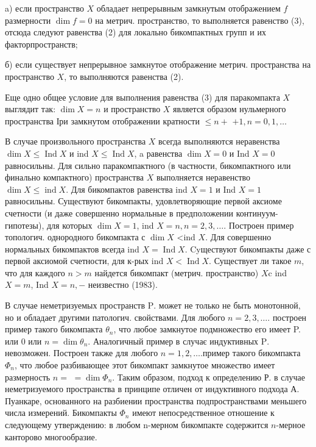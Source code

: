 \documentclass[10pt]{article}
\begin{document}
a) если пространство $X$ обладает непрерывным замкнутым отображением $f$ размерности $\operatorname{dim} f=0$ на метрич. пространство, то выполняется равенство (3), отсюда следуют равенства (2) для локально бикомпактных групп и их факторпространств;



б) если существует непрерывное замкнутое отображение метрич. пространства на пространство $X$, то выполняются равенства (2).



Еще одно общее условие для выполнения равенства (3) для паракомпакта $X$ выглядит так: $\operatorname{dim} X=n$ и пространство $X$ является образом нульмерного пространства Іри замкнутом отображении кратности $\leqslant n+$ $+1, n=0,1, \ldots$



В случае произвольного пространства $X$ всегда выполняются неравенства $\operatorname{dim} X \leqslant \operatorname{Ind} X$ и ind $X \leqslant \operatorname{Ind} X$, a равенства $\operatorname{dim} X=0$ и Ind $X=0$ равносильны. Для сильно паракомпактного (в частности, бикомпактного или финально компактного) пространства $X$ выполняется неравенство $\operatorname{dim} X \leqslant \operatorname{ind} X$. Для бикомпактов равенства ind $X=1$ и Ind $X=1$ равносильны. Существуют бикомпакты, удовлетворяющие первой аксиоме счетности (и даже совершенно нормальные в предположении континуум-гипотезы), для которых $\operatorname{dim} X=1$, ind $X=n, n=2,3, \ldots$. Построен пример топологич. однородного бикомпакта с $\operatorname{dim} X$ <ind $X$. Для совершенно нормальных бикомпактов всегда ind $X=\operatorname{Ind} X$. Cyществуют бикомпакты даже с первой аксиомой счетности, для к-рых ind $X<\operatorname{Ind} X$. Существует ли такое $m$, что для каждого $n>m$ найдется бикомпакт (метрич. пространство) $X \mathrm{c}$ ind $X=m$, Ind $X=n,-$ неизвестно (1983).



В случае неметризуемых пространств $\mathrm{P}$. может не только не быть монотонной, но и обладает другими патологич. свойствами. Для любого $n=2,3, \ldots$. построен пример такого бикомпакта $\theta_{n}$, что любое замкнутое подмножество его имеет P. или 0 или $n=\operatorname{dim} \theta_{n}$. Аналогичный пример в случає индуктивных $\mathrm{P}$. невозможен. Построен также для любого $n=1,2, \ldots$.пример такого бикомпакта $\Phi_{n}$, что любое разбивающее этот бикомпакт замкнутое множество имеет размерность $n=$ $=\operatorname{dim} \Phi_{n}$. Таким образом, подход к определению Р. в случае неметризуемого пространства в принципе отличен от индуктивного подхода А. Пуанкаре, основанного на разбиении пространства подпространствами меньшего числа измерений. Бикомпакты $\Phi_{n}$ имеют непосредственное отношение к следующему утверждению: в любом n-мерном бикомпакте содержится $n$-мерное канторово многообразие.
\end{document}
